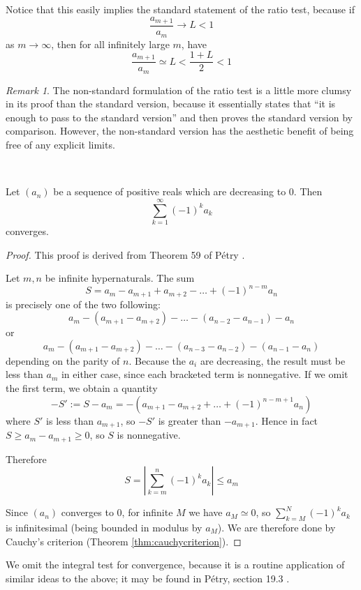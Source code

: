 \documentclass[11pt]{amsart}
\theoremstyle{remark}
\newtheorem*{remark}{Remark}
\newcommand{\near}{\simeq}
\begin{document}
Notice that this easily implies the standard statement of the ratio test, because if $$\frac{a_{m+1}}{a_m} \to L < 1$$ as $m \to \infty$, then for all infinitely large $m$, have $$\frac{a_{m+1}}{a_m} \near L < \frac{1+L}{2} < 1$$

\begin{remark}
The non-standard formulation of the ratio test is a little more clumsy in its proof than the standard version, because it essentially states that ``it is enough to pass to the standard version'' and then proves the standard version by comparison.
However, the non-standard version has the aesthetic benefit of being free of any explicit limits.
\end{remark}

\

\begin{thm}
Let $(a_n)$ be a sequence of positive reals which are decreasing to $0$.
Then $$\sum_{k=1}^{\infty} (-1)^k a_k$$ converges.
\end{thm}
\begin{proof}
This proof is derived from Theorem 59 of P\'etry \cite{petry}.

Let $m, n$ be infinite hypernaturals.
The sum $$S = a_m - a_{m+1} + a_{m+2} - \dots + (-1)^{n-m} a_n$$ is precisely one of the two following: $$a_m - (a_{m+1} - a_{m+2}) - \dots - (a_{n-2} - a_{n-1}) - a_n$$ or $$a_m - (a_{m+1} - a_{m+2}) - \dots - (a_{n-3} - a_{n-2}) - (a_{n-1} - a_n)$$
depending on the parity of $n$.
Because the $a_i$ are decreasing, the result must be less than $a_m$ in either case, since each bracketed term is nonnegative.
If we omit the first term, we obtain a quantity $$-S' := S - a_m = -(a_{m+1} - a_{m+2} + \dots + (-1)^{n-m+1} a_n)$$ where $S'$ is less than $a_{m+1}$, so $-S'$ is greater than $-a_{m+1}$.
Hence in fact $S \geq a_m - a_{m+1} \geq 0$, so $S$ is nonnegative.

Therefore $$S = \left | \sum_{k=m}^n (-1)^k a_k \right | \leq a_m$$

Since $(a_n)$ converges to $0$, for infinite $M$ we have $a_M \near 0$, so $\sum_{k=M}^N (-1)^k a_k$ is infinitesimal (being bounded in modulus by $a_M$).
We are therefore done by Cauchy's criterion (Theorem \ref{thm:cauchycriterion}).
\end{proof}

We omit the integral test for convergence, because it is a routine application of similar ideas to the above; it may be found in P\'etry, section 19.3 \cite{petry}.
\end{document}
